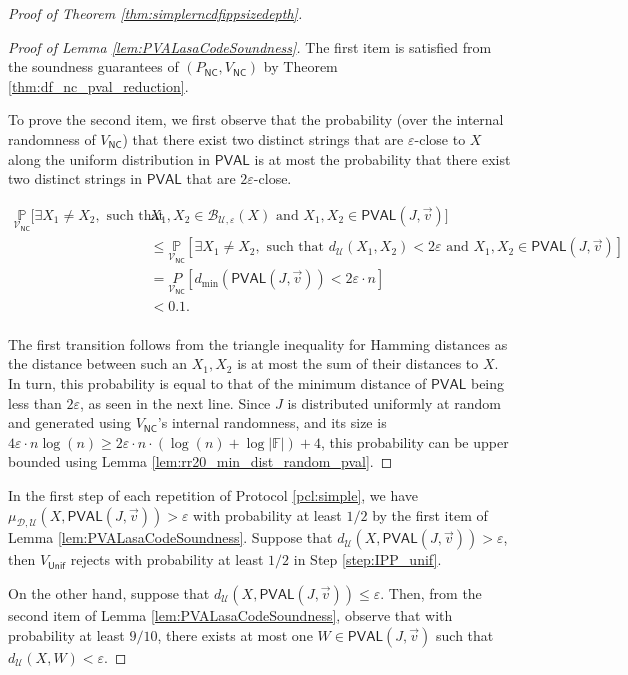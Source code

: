 \documentclass[11pt]{article}
\newcommand{\NC}{\mathsf{NC}}
\newcommand{\PVAL}{\mathsf{PVAL}}
\newcommand{\F}{\mathbb{F}}
\newcommand{\sU}{\mathcal{U}}
\newcommand{\sD}{\mathcal{D}}
\newcommand{\sB}{\mathcal{B}}
\begin{document}
\begin{proof}[Proof of Theorem \ref{thm:simplerncdfippsizedepth}]
\begin{proof}[Proof of Lemma \ref{lem:PVALasaCodeSoundness}]
    The first item is satisfied from the soundness guarantees of $(P_\NC,V_\NC)$ by Theorem \ref{thm:df_nc_pval_reduction}. 
    
    To prove the second item, we first observe that the probability (over the internal randomness of $V_\NC$) that there exist two distinct strings that are $\varepsilon$-close to $X$ along the uniform distribution in $\PVAL$ is at most the probability that there exist two distinct strings in $\PVAL$ that are $2\varepsilon$-close.

    \[
    \begin{split}
        \underset{\mathcal{V}_{\NC}}{\mathbb{P}}[\exists X_1 \neq X_2, \text{ such that } &X_1, X_2 \in \sB_{\sU,\varepsilon}(X) \text{ and } X_{1},X_{2} \in \PVAL(J,\vec{v})]\\ 
        &\leq \underset{\mathcal{V}_{\NC}}{\mathbb{P}}[\exists X_1 \neq X_2, \text{ such that } d_{\mathcal{U}}(X_1, X_2)<2\varepsilon \text{ and } X_{1},X_{2} \in \PVAL(J,\vec{v})]\\
        &=\underset{\mathcal{V}_{\NC}}{P}[d_{\min}(\PVAL(J,\vec{v}))<2\varepsilon \cdot n] \\ 
        &< 0.1. \\
    \end{split}
    \]

    The first transition follows from the triangle inequality for Hamming distances as the distance between such an $X_{1},X_{2}$ is at most the sum of their distances to $X$. In turn, this probability is equal to that of the minimum distance of $\PVAL$ being less than $2\varepsilon$, as seen in the next line. Since $J$ is distributed uniformly at random and generated using $V_\NC$'s internal randomness, and its size is $4\varepsilon\cdot n \log (n)\geq 2\varepsilon\cdot n\cdot (\log (n) +\log |\F|)+4$, this probability can be upper bounded using Lemma \ref{lem:rr20_min_dist_random_pval}.
\end{proof}
    
    In the first step of each repetition of Protocol \ref{pcl:simple}, we have $\mu_{\sD,\sU}(X,\PVAL(J,\vec{v}))>\varepsilon$ with probability at least $1/2$ by the first item of Lemma \ref{lem:PVALasaCodeSoundness}. Suppose that $d_{\sU}(X,\PVAL(J,\vec{v}))>\varepsilon$, then $V_{\mathsf{Unif}}$ rejects with probability at least $1/2$ in Step \ref{step:IPP_unif}. 
    
    On the other hand, suppose that $d_{\sU}(X,\PVAL(J,\vec{v}))\leq\varepsilon$. Then, from the second item of Lemma \ref{lem:PVALasaCodeSoundness}, observe that with probability at least $9/10$, there exists at most one $W\in \PVAL(J,\vec{v})$ such that $d_{\sU}(X,W)<\varepsilon$. 
    

\end{proof}
\end{document}
